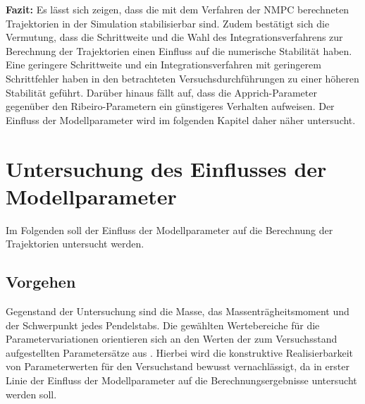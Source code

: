 \textbf{Fazit:}
Es lässt sich zeigen, dass die mit dem Verfahren der NMPC berechneten Trajektorien in der Simulation stabilisierbar sind. Zudem bestätigt sich die Vermutung, dass die Schrittweite und die Wahl des Integrationsverfahrens zur Berechnung der Trajektorien einen Einfluss auf die numerische Stabilität haben. Eine geringere Schrittweite und ein Integrationsverfahren mit geringerem Schrittfehler haben in den betrachteten Versuchsdurchführungen zu einer höheren Stabilität geführt. Darüber hinaus fällt auf, dass die Apprich-Parameter gegenüber den Ribeiro-Parametern ein günstigeres Verhalten aufweisen. Der Einfluss der Modellparameter wird im folgenden Kapitel daher näher untersucht. 

\section{Untersuchung des Einflusses der Modellparameter}\label{sec:trjparamtest}

Im Folgenden soll der Einfluss der Modellparameter auf die Berechnung der Trajektorien untersucht werden.

\subsection{Vorgehen}

Gegenstand der Untersuchung sind die Masse, das Massenträgheitsmoment und der Schwerpunkt jedes Pendelstabs. Die gewählten Wertebereiche für die Parametervariationen orientieren sich an den Werten der zum Versuchsstand aufgestellten Parametersätze aus . Hierbei wird die konstruktive Realisierbarkeit von Parameterwerten für den Versuchstand bewusst vernachlässigt, da in erster Linie der Einfluss der Modellparameter auf die Berechnungsergebnisse untersucht werden soll.

